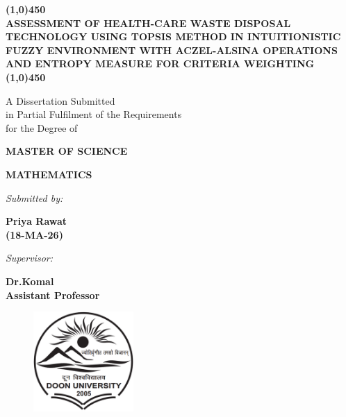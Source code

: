 \begin{titlepage}

\begin{center}

  \vfill

  \textbf{\Large \MakeUppercase{\line(1,0){450}\\ASSESSMENT OF HEALTH-CARE WASTE DISPOSAL TECHNOLOGY using TOPSIS Method in Intuitionistic Fuzzy Environment with Aczel-Alsina 
Operations and Entropy Measure for Criteria Weighting\\ \line(1,0){450}} }\\[10pt]

  \vfill

  A Dissertation Submitted \\
  in Partial Fulfilment of the Requirements  \\
  for the Degree of  \\

  \vfill

  {\Large \bf MASTER OF SCIENCE }

  \vfill


  \vfill

  {\large \bf MATHEMATICS }

  \vfill

  {\em  Submitted by:} 

  \vfill

  {\large \bf Priya Rawat} \\[0.3em] %
  {\large \bf (18-MA-26) }\\[0.5em]

   \vfill

  {\em  Supervisor:} 

  \vfill

  {\large \bf Dr.Komal} \\[0.3em] %
  {\large \bf Assistant Professor}\\[0.5em]

  \vfill

  \begin{figure}[h]
    \begin{center}
      \includegraphics[height=38mm]{figures/logo/Doon_University_logo.png}
    \end{center}
  \end{figure}


\end{center}
\end{titlepage}
